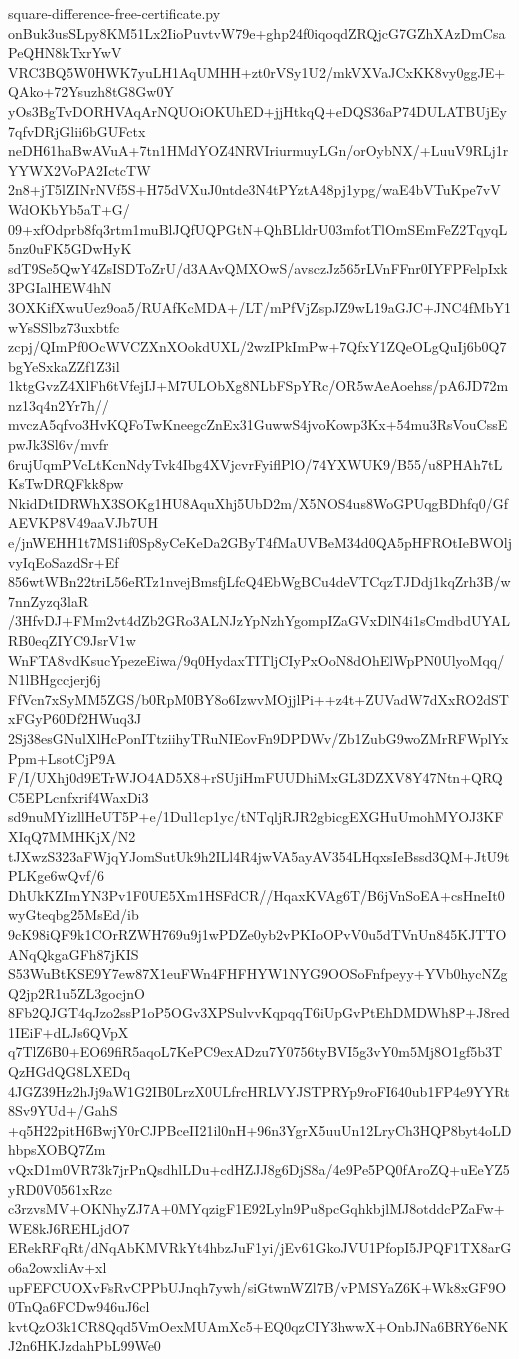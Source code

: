 \documentclass[11pt]{article}
\theoremstyle{definition}
\theoremstyle{remark}
\begin{document}
\begin{filecontents*}[overwrite]{square-difference-free-certificate.py}
onBuk3usSLpy8KM51Lx2IioPuvtvW79e+ghp24f0iqoqdZRQjcG7GZhXAzDmCsaPeQHN8kTxrYwV
VRC3BQ5W0HWK7yuLH1AqUMHH+zt0rVSy1U2/mkVXVaJCxKK8vy0ggJE+QAko+72Ysuzh8tG8Gw0Y
yOs3BgTvDORHVAqArNQUOiOKUhED+jjHtkqQ+eDQS36aP74DULATBUjEy7qfvDRjGlii6bGUFctx
neDH61haBwAVuA+7tn1HMdYOZ4NRVIriurmuyLGn/orOybNX/+LuuV9RLj1rYYWX2VoPA2IctcTW
2n8+jT5lZINrNVf5S+H75dVXuJ0ntde3N4tPYztA48pj1ypg/waE4bVTuKpe7vVWdOKbYb5aT+G/
09+xfOdprb8fq3rtm1muBlJQfUQPGtN+QhBLldrU03mfotTlOmSEmFeZ2TqyqL5nz0uFK5GDwHyK
sdT9Se5QwY4ZsISDToZrU/d3AAvQMXOwS/avsczJz565rLVnFFnr0IYFPFelpIxk3PGIalHEW4hN
3OXKifXwuUez9oa5/RUAfKcMDA+/LT/mPfVjZspJZ9wL19aGJC+JNC4fMbY1wYsSSlbz73uxbtfc
zcpj/QImPf0OcWVCZXnXOokdUXL/2wzIPkImPw+7QfxY1ZQeOLgQuIj6b0Q7bgYeSxkaZZf1Z3il
1ktgGvzZ4XlFh6tVfejIJ+M7ULObXg8NLbFSpYRc/OR5wAeAoehss/pA6JD72mnz13q4n2Yr7h//
mvczA5qfvo3HvKQFoTwKneegcZnEx31GuwwS4jvoKowp3Kx+54mu3RsVouCssEpwJk3Sl6v/mvfr
6rujUqmPVcLtKcnNdyTvk4Ibg4XVjcvrFyiflPlO/74YXWUK9/B55/u8PHAh7tLKsTwDRQFkk8pw
NkidDtIDRWhX3SOKg1HU8AquXhj5UbD2m/X5NOS4us8WoGPUqgBDhfq0/GfAEVKP8V49aaVJb7UH
e/jnWEHH1t7MS1if0Sp8yCeKeDa2GByT4fMaUVBeM34d0QA5pHFROtIeBWOljvyIqEoSazdSr+Ef
856wtWBn22triL56eRTz1nvejBmsfjLfcQ4EbWgBCu4deVTCqzTJDdj1kqZrh3B/w7nnZyzq3laR
/3HfvDJ+FMm2vt4dZb2GRo3ALNJzYpNzhYgompIZaGVxDlN4i1sCmdbdUYALRB0eqZIYC9JsrV1w
WnFTA8vdKsucYpezeEiwa/9q0HydaxTITljCIyPxOoN8dOhElWpPN0UlyoMqq/N1lBHgccjerj6j
FfVcn7xSyMM5ZGS/b0RpM0BY8o6IzwvMOjjlPi++z4t+ZUVadW7dXxRO2dSTxFGyP60Df2HWuq3J
2Sj38esGNulXlHcPonITtziihyTRuNIEovFn9DPDWv/Zb1ZubG9woZMrRFWplYxPpm+LsotCjP9A
F/I/UXhj0d9ETrWJO4AD5X8+rSUjiHmFUUDhiMxGL3DZXV8Y47Ntn+QRQC5EPLcnfxrif4WaxDi3
sd9nuMYizllHeUT5P+e/1Dul1cp1yc/tNTqljRJR2gbicgEXGHuUmohMYOJ3KFXIqQ7MMHKjX/N2
tJXwzS323aFWjqYJomSutUk9h2ILl4R4jwVA5ayAV354LHqxsIeBssd3QM+JtU9tPLKge6wQvf/6
DhUkKZImYN3Pv1F0UE5Xm1HSFdCR//HqaxKVAg6T/B6jVnSoEA+csHneIt0wyGteqbg25MsEd/ib
9cK98iQF9k1COrRZWH769u9j1wPDZe0yb2vPKIoOPvV0u5dTVnUn845KJTTOANqQkgaGFh87jKIS
S53WuBtKSE9Y7ew87X1euFWn4FHFHYW1NYG9OOSoFnfpeyy+YVb0hycNZgQ2jp2R1u5ZL3gocjnO
8Fb2QJGT4qJzo2ssP1oP5OGv3XPSulvvKqpqqT6iUpGvPtEhDMDWh8P+J8red1IEiF+dLJs6QVpX
q7TlZ6B0+EO69fiR5aqoL7KePC9exADzu7Y0756tyBVI5g3vY0m5Mj8O1gf5b3TQzHGdQG8LXEDq
4JGZ39Hz2hJj9aW1G2IB0LrzX0ULfrcHRLVYJSTPRYp9roFI640ub1FP4e9YYRt8Sv9YUd+/GahS
+q5H22pitH6BwjY0rCJPBceII21il0nH+96n3YgrX5uuUn12LryCh3HQP8byt4oLDhbpsXOBQ7Zm
vQxD1m0VR73k7jrPnQsdhlLDu+cdHZJJ8g6DjS8a/4e9Pe5PQ0fAroZQ+uEeYZ5yRD0V0561xRzc
c3rzvsMV+OKNhyZJ7A+0MYqzigF1E92Lyln9Pu8pcGqhkbjlMJ8otddcPZaFw+WE8kJ6REHLjdO7
ERekRFqRt/dNqAbKMVRkYt4hbzJuF1yi/jEv61GkoJVU1PfopI5JPQF1TX8arGo6a2owxliAv+xl
upFEFCUOXvFsRvCPPbUJnqh7ywh/siGtwnWZl7B/vPMSYaZ6K+Wk8xGF9O0TnQa6FCDw946uJ6cl
kvtQzO3k1CR8Qqd5VmOexMUAmXc5+EQ0qzCIY3hwwX+OnbJNa6BRY6eNKJ2n6HKJzdahPbL99We0

\end{filecontents*}
\end{document}
